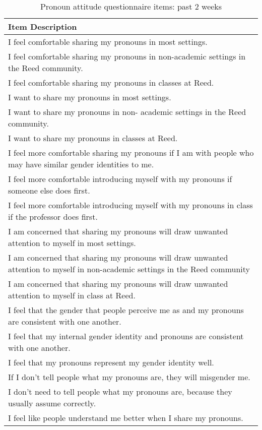 \documentclass[12pt,twoside]{reedthesis}
\begin{document}
\begin{table}
\caption{\label{tab:unnamed-chunk-1}Pronoun attitude questionnaire items: past 2 weeks}
\centering
\begin{tabular}[t]{l}
\hline
Item Description\\
\hline
I feel comfortable sharing my pronouns in most settings.\\
\hline
I feel comfortable sharing my pronouns in non-academic settings in the Reed community.\\
\hline
I feel comfortable sharing my pronouns in classes at Reed.\\
\hline
I want to share my pronouns in most settings.\\
\hline
I want to share my pronouns in non- academic settings in the Reed community.\\
\hline
I want to share my pronouns in classes at Reed.\\
\hline
I feel more comfortable sharing my pronouns if I am with people who may have similar gender identities to me.\\
\hline
I feel more comfortable introducing myself with my pronouns if someone else does first.\\
\hline
I feel more comfortable introducing myself with my pronouns in class if the professor does first.\\
\hline
I am concerned that sharing my pronouns will draw unwanted attention to myself in most settings.\\
\hline
I am concerned that sharing my pronouns will draw unwanted attention to myself in non-academic settings in the Reed community\\
\hline
I am concerned that sharing my pronouns will draw unwanted attention to myself in class at Reed.\\
\hline
I feel that the gender that people perceive me as and my pronouns are consistent with one another.\\
\hline
I feel that my internal gender identity and pronouns are consistent with one another.\\
\hline
I feel that my pronouns represent my gender identity well.\\
\hline
If I don’t tell people what my pronouns are, they will misgender me.\\
\hline
I don’t need to tell people what my pronouns are, because they usually assume correctly.\\
\hline
I feel like people understand me better when I share my pronouns.\\
\hline
\end{tabular}
\end{table}
\end{document}
